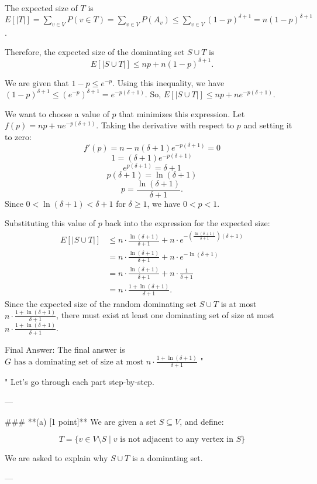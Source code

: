 \begin{enumerate}
\begin{shaded}
The expected size of $T$ is $E[|T|] = \sum_{v \in V} P(v \in T) = \sum_{v \in V} P(A_v) \le \sum_{v \in V} (1-p)^{\delta+1} = n(1-p)^{\delta+1}$.

Therefore, the expected size of the dominating set $S \cup T$ is
$$E[|S \cup T|] \le np + n(1-p)^{\delta+1}.$$

We are given that $1-p \le e^{-p}$. Using this inequality, we have $(1-p)^{\delta+1} \le (e^{-p})^{\delta+1} = e^{-p(\delta+1)}$.
So, $E[|S \cup T|] \le np + ne^{-p(\delta+1)}$.

We want to choose a value of $p$ that minimizes this expression. Let $f(p) = np + ne^{-p(\delta+1)}$. Taking the derivative with respect to $p$ and setting it to zero:
$$f'(p) = n - n(\delta+1)e^{-p(\delta+1)} = 0$$
$$1 = (\delta+1)e^{-p(\delta+1)}$$
$$e^{p(\delta+1)} = \delta+1$$
$$p(\delta+1) = \ln(\delta+1)$$
$$p = \frac{\ln(\delta+1)}{\delta+1}.$$
Since $0 < \ln(\delta+1) < \delta+1$ for $\delta \ge 1$, we have $0 < p < 1$.

Substituting this value of $p$ back into the expression for the expected size:
\begin{align*} E[|S \cup T|] &\le n \cdot \frac{\ln(\delta+1)}{\delta+1} + n \cdot e^{-\left(\frac{\ln(\delta+1)}{\delta+1}\right)(\delta+1)} \\ &= n \cdot \frac{\ln(\delta+1)}{\delta+1} + n \cdot e^{-\ln(\delta+1)} \\ &= n \cdot \frac{\ln(\delta+1)}{\delta+1} + n \cdot \frac{1}{\delta+1} \\ &= n \cdot \frac{1 + \ln(\delta+1)}{\delta+1}. \end{align*}
Since the expected size of the random dominating set $S \cup T$ is at most $n \cdot \frac{1 + \ln(\delta+1)}{\delta+1}$, there must exist at least one dominating set of size at most $n \cdot \frac{1 + \ln(\delta+1)}{\delta+1}$.

Final Answer: The final answer is $\boxed{G \text{ has a dominating set of size at most } n\cdot \frac{1+\ln(\delta+1)}{\delta+1}}$
"

"
Let's go through each part step-by-step.

---

### **(a) [1 point]**
We are given a set \( S \subseteq V \), and define:

\[
T = \{v \in V \setminus S \mid v \text{ is not adjacent to any vertex in } S\}
\]

We are asked to explain why \( S \cup T \) is a dominating set.

---


\end{shaded}
\end{enumerate}
